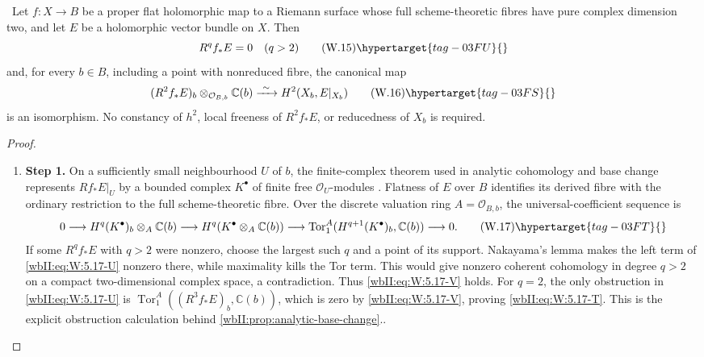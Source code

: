 \begin{corollary}
\hypertarget{tag-03DV}{}\label{wbII:cor:surface-top-base-change}

\ Let $f:X\to B$ be a proper flat holomorphic map to a Riemann
surface whose full scheme-theoretic fibres have pure complex dimension two,
and let $E$ be a holomorphic vector bundle on $X$.  Then
\[
 R^qf_*E=0\quad(q>2)
 \tag{W.15}\hypertarget{tag-03FU}{}\label{wbII:eq:W:5.17-V}
\]
and, for every $b\in B$, including a point with nonreduced fibre, the
canonical map
\[
 (R^2f_*E)_b\otimes_{\mathcal O_{B,b}}\mathbb C(b)
 \xrightarrow{\ \sim\ }H^2(X_b,E|_{X_b})
 \tag{W.16}\hypertarget{tag-03FS}{}\label{wbII:eq:W:5.17-T}
\]
is an isomorphism.  No constancy of $h^2$, local freeness of $R^2f_*E$, or
reducedness of $X_b$ is required.
\end{corollary}



\begin{proof}
\begin{enumerate}[label={$\langle1\rangle$\arabic*.},leftmargin=*]
\item 
\noindent\textbf{Step 1.} On a sufficiently small neighbourhood $U$ of $b$, the finite-complex theorem
used in analytic cohomology and base change represents $Rf_*E|_U$ by a
bounded complex $K^\bullet$ of finite free $\mathcal O_U$-modules
\cite[Chapter~III, \S4, Theorem~4.1, p.~124]{BS76push}.  Flatness of
$E$ over $B$ identifies its derived fibre with the ordinary restriction to
the full scheme-theoretic fibre.  Over the discrete valuation ring
$A=\mathcal O_{B,b}$, the universal-coefficient sequence is
\[
0\longrightarrow H^q(K^\bullet)_b\otimes_A\mathbb C(b)
 \longrightarrow H^q(K^\bullet\otimes_A\mathbb C(b))
 \longrightarrow
 \operatorname{Tor}_1^A(H^{q+1}(K^\bullet)_b,\mathbb C(b))
 \longrightarrow0.
\tag{W.17}\hypertarget{tag-03FT}{}\label{wbII:eq:W:5.17-U}
\]
If some $R^qf_*E$ with $q>2$ were nonzero, choose the largest such $q$ and a
point of its support.  Nakayama's lemma makes the left term of \eqref{wbII:eq:W:5.17-U}
nonzero there, while maximality kills the Tor term.  This would give nonzero
coherent cohomology in degree $q>2$ on a compact two-dimensional complex
space, a contradiction.  Thus \eqref{wbII:eq:W:5.17-V} holds.  For $q=2$, the only
obstruction in \eqref{wbII:eq:W:5.17-U} is
$\operatorname{Tor}_1^A((R^3f_*E)_b,\mathbb C(b))$, which is zero by
\eqref{wbII:eq:W:5.17-V}, proving \eqref{wbII:eq:W:5.17-T}.  This is the explicit obstruction calculation
behind \cref{wbII:prop:analytic-base-change}..

\end{enumerate}
\end{proof}